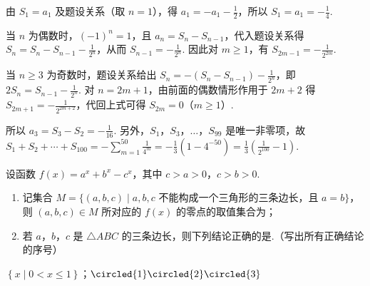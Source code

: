 \begin{solution}
由 \(S_{1}=a_{1}\) 及题设关系（取 \(n=1\)），得 \(a_{1}=-a_{1}-\frac{1}{2}\)，所以 \(S_{1}=a_{1}=-\frac{1}{4}\).

当 \(n\) 为偶数时，\((-1)^{n}=1\)，且 \(a_{n}=S_{n}-S_{n-1}\)，代入题设关系得
\(S_{n}=S_{n}-S_{n-1}-\frac{1}{2^{n}}\)，从而 \(S_{n-1}=-\frac{1}{2^{n}}\). 因此对 \(m\geqslant1\)，有 \(S_{2m-1}=-\frac{1}{2^{2m}}\).

当 \(n\geqslant3\) 为奇数时，题设关系给出
\(S_{n}=-(S_{n}-S_{n-1})-\frac{1}{2^{n}}\)，即 \(2S_{n}=S_{n-1}-\frac{1}{2^{n}}\). 对 \(n=2m+1\)，由前面的偶数情形作用于 \(2m+2\) 得 \(S_{2m+1}=-\frac{1}{2^{2m+2}}\)，代回上式可得 \(S_{2m}=0\)（\(m\geqslant1\)）.

所以 \(a_{3}=S_{3}-S_{2}=-\frac{1}{16}\). 另外，\(S_{1}\)，\(S_{3}\)，\(\ldots\)，\(S_{99}\) 是唯一非零项，故
\(S_{1}+S_{2}+\cdots+S_{100}=-\sum_{m=1}^{50}\frac{1}{4^{m}}=-\frac{1}{3}(1-4^{-50})=\frac{1}{3}\left(\frac{1}{2^{100}}-1\right)\).
\end{solution}

\begin{problem}
设函数 \(f(x) = a^x + b^x - c^x\)，其中 \(c > a > 0\)，\(c > b > 0\).
\begin{enumerate}
\item 记集合 \(M = \{(a, b, c) \mid a, b, c\) 不能构成一个三角形的三条边长，且 \(a = b\}\)，则 \((a, b, c) \in M\) 所对应的 \(f(x)\) 的零点的取值集合为\fillinblank{}；
\item 若 \(a\)，\(b\)，\(c\) 是 \(\triangle ABC\) 的三条边长，则下列结论正确的是\fillinblank{}.（写出所有正确结论的序号）
\end{enumerate}
\end{problem}

\begin{answer}
\(\left\{x \mid 0 < x \leqslant 1\right\}\)；\(\circled{1}\circled{2}\circled{3}\)
\end{answer}

